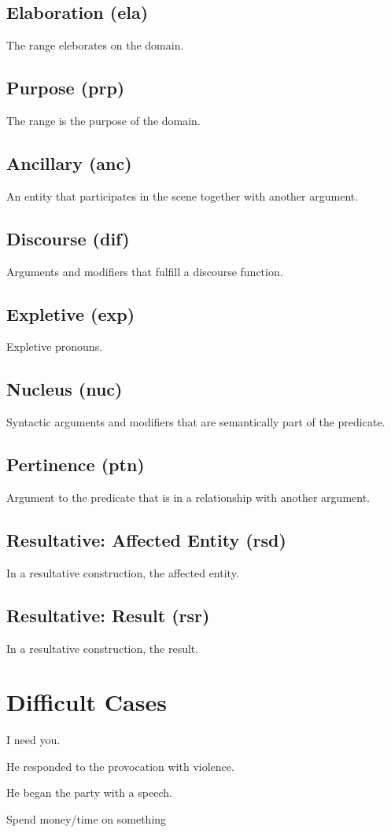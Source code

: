 \documentclass[a4paper]{article}
\begin{document}
\subsection{Elaboration (ela)}

The range eleborates on the domain.

\subsection{Purpose (prp)}

The range is the purpose of the domain.

\subsection{Ancillary (anc)}

An entity that participates in the scene together with another argument.

\subsection{Discourse (dif)}

Arguments and modifiers that fulfill a discourse function.

\subsection{Expletive (exp)}

Expletive pronouns.

\subsection{Nucleus (nuc)}

Syntactic arguments and modifiers that are semantically part of the predicate.

\subsection{Pertinence (ptn)}

Argument to the predicate that is in a relationship with another argument.

\subsection{Resultative: Affected Entity (rsd)}

In a resultative construction, the affected entity.

\subsection{Resultative: Result (rsr)}

In a resultative construction, the result.

\section{Difficult Cases}

I need you.

He responded to the provocation with violence.

He began the party with a speech.

Spend money/time on something
\end{document}
